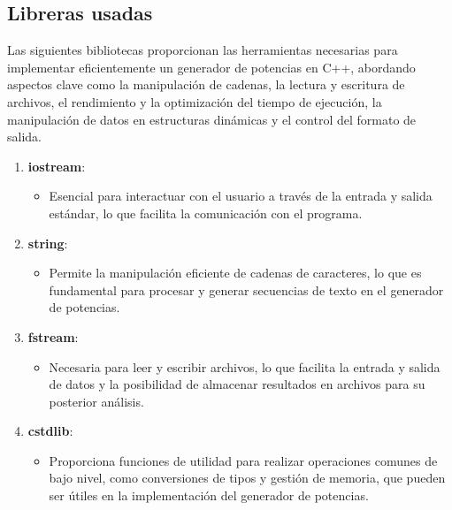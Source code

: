 \documentclass{article}
\begin{document}
    \subsection[Librerias]{Libreras usadas}
        Las siguientes bibliotecas proporcionan las herramientas necesarias para implementar eficientemente un generador de potencias en C++, abordando aspectos clave como la manipulación de cadenas, la lectura y escritura de archivos, el rendimiento y la optimización del tiempo de ejecución, la manipulación de datos en estructuras dinámicas y el control del formato de salida.


        \begin{enumerate}
            \item \textbf{iostream}:
            \begin{itemize}
                \item Esencial para interactuar con el usuario a través de la entrada y salida estándar, lo que facilita la
                comunicación con el programa.
            \end{itemize}

            \item \textbf{string}:
            \begin{itemize}
                \item Permite la manipulación eficiente de cadenas de caracteres, lo que es fundamental para procesar y generar
                secuencias de texto en el generador de potencias.
            \end{itemize}

            \item \textbf{fstream}:
            \begin{itemize}
                \item Necesaria para leer y escribir archivos, lo que facilita la entrada y salida de datos y la posibilidad de
                almacenar resultados en archivos para su posterior análisis.
            \end{itemize}

            \item \textbf{cstdlib}:
            \begin{itemize}
                \item Proporciona funciones de utilidad para realizar operaciones comunes de bajo nivel, como conversiones de
                tipos y gestión de memoria, que pueden ser útiles en la implementación del generador de potencias.
            \end{itemize}


\end{enumerate}
\end{document}
